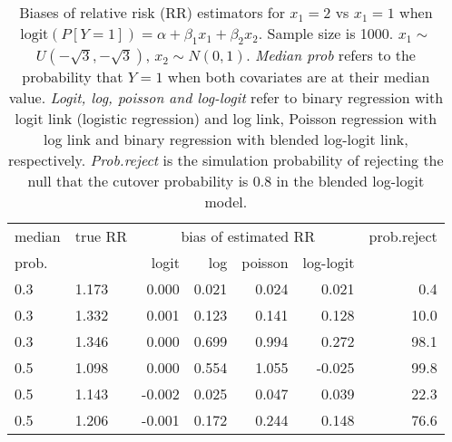 \documentclass[12pt,a4paper]{article}
\begin{document}
\begin{table}[H] 
\small\sf\centering 
\caption{Biases of relative risk (RR) estimators for $x_1=2$ vs $x_1=1$ when $\mbox{logit}(P[Y=1])=\alpha+\beta_1 x_1 + \beta_2 x_2$. Sample size is 1000. $x_1 \sim $$U(-\sqrt{3},-\sqrt{3})$, $x_2 \sim N(0,1)$. {\it Median prob} refers to the probability that $Y=1$ when both covariates are at their median value. {\it Logit, log, poisson and log-logit} refer to binary regression with logit link (logistic regression) and log link, Poisson regression with log link and binary regression with blended log-logit link, respectively. {\it Prob.reject} is the simulation probability of rejecting the null that the cutover probability is $0.8$ in the blended log-logit model.} 
\begin{tabular}{llrrrrr} 
\toprule 
median & true RR & \multicolumn{4}{c}{bias of estimated RR} & prob.reject \\ 
prob. & & logit & log & poisson & log-logit  & \\ \midrule 
0.3 & 1.173 &  0.000 & 0.021 & 0.024 &  0.021 &  0.4 \\  
0.3 & 1.332 &  0.001 & 0.123 & 0.141 &  0.128 & 10.0 \\  
0.3 & 1.346 &  0.000 & 0.699 & 0.994 &  0.272 & 98.1 \\  
0.5 & 1.098 &  0.000 & 0.554 & 1.055 & -0.025 & 99.8 \\  
0.5 & 1.143 & -0.002 & 0.025 & 0.047 &  0.039 & 22.3 \\  
0.5 & 1.206 & -0.001 & 0.172 & 0.244 &  0.148 & 76.6 \\  
\bottomrule 
\end{tabular} 
\end{table} 
\end{document}

